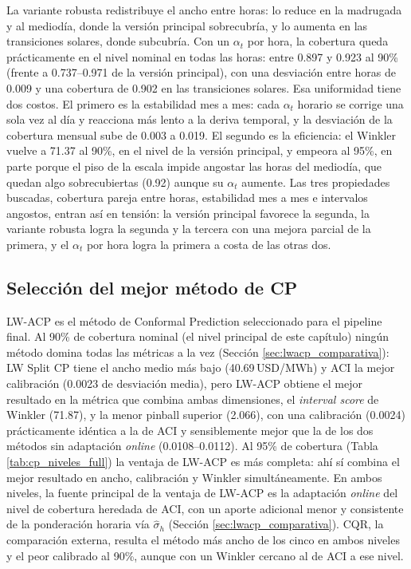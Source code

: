 La variante robusta redistribuye el ancho entre horas: lo reduce en la madrugada y al mediodía, donde la versión principal sobrecubría, y lo aumenta en las transiciones solares, donde subcubría. Con un $\alpha_t$ por hora, la cobertura queda prácticamente en el nivel nominal en todas las horas: entre 0.897 y 0.923 al 90\% (frente a 0.737--0.971 de la versión principal), con una desviación entre horas de 0.009 y una cobertura de 0.902 en las transiciones solares. Esa uniformidad tiene dos costos. El primero es la estabilidad mes a mes: cada $\alpha_t$ horario se corrige una sola vez al día y reacciona más lento a la deriva temporal, y la desviación de la cobertura mensual sube de 0.003 a 0.019. El segundo es la eficiencia: el Winkler vuelve a 71.37 al 90\%, en el nivel de la versión principal, y empeora al 95\%, en parte porque el piso de la escala impide angostar las horas del mediodía, que quedan algo sobrecubiertas (0.92) aunque su $\alpha_t$ aumente. Las tres propiedades buscadas, cobertura pareja entre horas, estabilidad mes a mes e intervalos angostos, entran así en tensión: la versión principal favorece la segunda, la variante robusta logra la segunda y la tercera con una mejora parcial de la primera, y el $\alpha_t$ por hora logra la primera a costa de las otras dos.

\subsection{Selección del mejor método de CP}

LW-ACP es el método de Conformal Prediction seleccionado para el pipeline final. Al 90\% de cobertura nominal (el nivel principal de este capítulo) ningún método domina todas las métricas a la vez (Sección \ref{sec:lwacp_comparativa}): LW Split CP tiene el ancho medio más bajo (40.69\,USD/MWh) y ACI la mejor calibración (0.0023 de desviación media), pero LW-ACP obtiene el mejor resultado en la métrica que combina ambas dimensiones, el \textit{interval score} de Winkler (71.87), y la menor pinball superior (2.066), con una calibración (0.0024) prácticamente idéntica a la de ACI y sensiblemente mejor que la de los dos métodos sin adaptación \textit{online} (0.0108--0.0112). Al 95\% de cobertura (Tabla \ref{tab:cp_niveles_full}) la ventaja de LW-ACP es más completa: ahí sí combina el mejor resultado en ancho, calibración y Winkler simultáneamente. En ambos niveles, la fuente principal de la ventaja de LW-ACP es la adaptación \textit{online} del nivel de cobertura heredada de ACI, con un aporte adicional menor y consistente de la ponderación horaria vía $\hat{\sigma}_h$ (Sección \ref{sec:lwacp_comparativa}). CQR, la comparación externa, resulta el método más ancho de los cinco en ambos niveles y el peor calibrado al 90\%, aunque con un Winkler cercano al de ACI a ese nivel.

